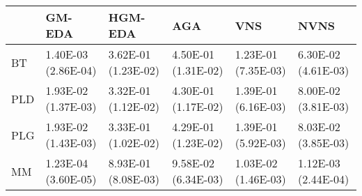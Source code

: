\begin{tabular}{llllll}
\toprule
{} &               GM-EDA &              HGM-EDA &                  AGA &                  VNS &                 NVNS \\
\midrule
BT  &  1.40E-03 (2.86E-04) &  3.62E-01 (1.23E-02) &  4.50E-01 (1.31E-02) &  1.23E-01 (7.35E-03) &  6.30E-02 (4.61E-03) \\
PLD &  1.93E-02 (1.37E-03) &  3.32E-01 (1.12E-02) &  4.30E-01 (1.17E-02) &  1.39E-01 (6.16E-03) &  8.00E-02 (3.81E-03) \\
PLG &  1.93E-02 (1.43E-03) &  3.33E-01 (1.02E-02) &  4.29E-01 (1.23E-02) &  1.39E-01 (5.92E-03) &  8.03E-02 (3.85E-03) \\
MM  &  1.23E-04 (3.60E-05) &  8.93E-01 (8.08E-03) &  9.58E-02 (6.34E-03) &  1.03E-02 (1.46E-03) &  1.12E-03 (2.44E-04) \\
\bottomrule
\end{tabular}
